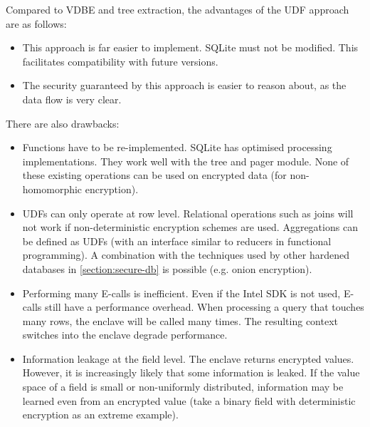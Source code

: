 \begin{enumerate}
Compared to VDBE and tree extraction, the advantages of the UDF approach are as follows:\label{ID_276876978}
\begin{itemize}\label{ID_1533966412}
\item This approach is far easier to implement.\label{ID_1874885591}
SQLite must not be modified. This facilitates compatibility with future versions.\label{ID_1628619896}
\item The security guaranteed by this approach is easier to reason about, as the data flow is very clear.\label{ID_395790458}
\end{itemize}\label{ID_1825313667}
There are also drawbacks:\label{ID_1006647983}
\begin{itemize}\label{ID_1382823746}
\item Functions have to be re-implemented.\label{ID_34604663}
SQLite has optimised processing implementations. They work well with the tree and pager module. None of these existing operations can be used on encrypted data (for non-homomorphic encryption).\label{ID_680487982}
\item UDFs can only operate at row level.\label{ID_910577627}
Relational operations such as joins will not work if non-deterministic encryption schemes are used.\label{ID_1857752388}
Aggregations can be defined as UDFs (with an interface similar to reducers in functional programming).\label{ID_1002933773}
A combination with the techniques used by other hardened databases in \autoref{section:secure-db} is possible (e.g. onion encryption).\label{ID_1235602590}
\item Performing many E-calls is inefficient.\label{ID_475441213}
Even if the Intel SDK is not used, E-calls still have a performance overhead.\label{ID_141593308}
When processing a query that touches many rows, the enclave will be called many times.\label{ID_907818609}
The resulting context switches into the enclave degrade performance.\label{ID_257744792}
\item Information leakage at the field level.\label{ID_1976381915}
The enclave returns encrypted values.\label{ID_736597701}
However, it is increasingly likely that some information is leaked.\label{ID_1737568991}
If the value space of a field is small or non-uniformly distributed, information may be learned even from an encrypted value (take a binary field with deterministic encryption as an extreme example).\label{ID_1608594282}
\end{itemize}\label{ID_1283973465}
\end{enumerate}\label{ID_852127889}

